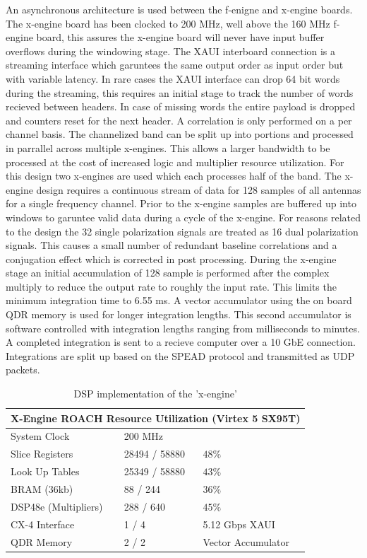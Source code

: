 \documentclass[useAMS,usenatbib,onecolumn]{mn2e}
\begin{document}
An asynchronous architecture is used between the f-enigne and x-engine boards.
The x-engine board has been clocked to 200 MHz, well above the 160 MHz f-engine board, this assures the x-engine board will never have input buffer overflows during the windowing stage.
The XAUI interboard connection is a streaming interface which garuntees the same output order as input order but with variable latency.
In rare cases the XAUI interface can drop 64 bit words during the streaming, this requires an initial stage to track the number of words recieved between headers.
In case of missing words the entire payload is dropped and counters reset for the next header.
A correlation is only performed on a per channel basis.
The channelized band can be split up into portions and processed in parrallel across multiple x-engines.
This allows a larger bandwidth to be processed at the cost of increased logic and multiplier resource utilization.
For this design two x-engines are used which each processes half of the band.
The x-engine design requires a continuous stream of data for 128 samples of all antennas for a single frequency channel.
Prior to the x-engine samples are buffered up into windows to garuntee valid data during a cycle of the x-engine.
For reasons related to the design the 32 single polarization signals are treated as 16 dual polarization signals.
This causes a small number of redundant baseline correlations and a conjugation effect which is corrected in post processing.
During the x-engine stage an initial accumulation of 128 sample is performed after the complex multiply to reduce the output rate to roughly the input rate.
This limits the minimum integration time to 6.55 ms.
A vector accumulator using the on board QDR memory is used for longer integration lengths.
This second accumulator is software controlled with integration lengths ranging from milliseconds to minutes.
A completed integration is sent to a recieve computer over a 10 GbE connection.
Integrations are split up based on the SPEAD protocol\citep{} and transmitted as UDP packets.

\begin{table}
\begin{center}
\begin{tabular}{| l | l | l |}
\hline
\multicolumn{3}{|c|}{X-Engine ROACH Resource Utilization (Virtex 5 SX95T)}\\
\hline
System Clock & 200 MHz \\
Slice Registers & 28494 / 58880 & $48\%$\\
Look Up Tables & 25349 / 58880 & $43\%$\\
BRAM (36kb) & 88 / 244 & $36\%$\\
DSP48e (Multipliers) & 288 / 640 & $45\%$\\
CX-4 Interface & 1 / 4 & 5.12 Gbps XAUI\\
QDR Memory & 2 / 2 & Vector Accumulator\\
\hline
\end{tabular}
\caption{DSP implementation of the 'x-engine'}
\label{tbl:xeng_resource}
\end{center}
\end{table}
\end{document}
